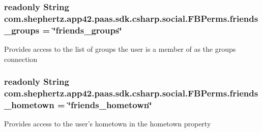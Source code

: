 \hypertarget{classcom_1_1shephertz_1_1app42_1_1paas_1_1sdk_1_1csharp_1_1social_1_1_f_b_perms_aeaef62a98578d7c92455857b0f237e31}{
\subsubsection[{friends\+\_\+groups}]{\setlength{\rightskip}{0pt plus 5cm}readonly String com.\+shephertz.\+app42.\+paas.\+sdk.\+csharp.\+social.\+F\+B\+Perms.\+friends\+\_\+groups = \char`\"{}friends\+\_\+groups\char`\"{}\hspace{0.3cm}{\ttfamily [static]}}}\label{classcom_1_1shephertz_1_1app42_1_1paas_1_1sdk_1_1csharp_1_1social_1_1_f_b_perms_aeaef62a98578d7c92455857b0f237e31}


Provides access to the list of groups the user is a member of as the groups connection 

\hypertarget{classcom_1_1shephertz_1_1app42_1_1paas_1_1sdk_1_1csharp_1_1social_1_1_f_b_perms_aea22ed4ca158e306f2964b6a3de1928b}{
\subsubsection[{friends\+\_\+hometown}]{\setlength{\rightskip}{0pt plus 5cm}readonly String com.\+shephertz.\+app42.\+paas.\+sdk.\+csharp.\+social.\+F\+B\+Perms.\+friends\+\_\+hometown = \char`\"{}friends\+\_\+hometown\char`\"{}\hspace{0.3cm}{\ttfamily [static]}}}\label{classcom_1_1shephertz_1_1app42_1_1paas_1_1sdk_1_1csharp_1_1social_1_1_f_b_perms_aea22ed4ca158e306f2964b6a3de1928b}


Provides access to the user's hometown in the hometown property 

